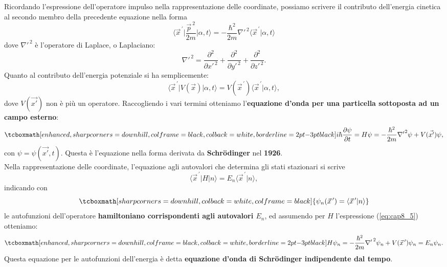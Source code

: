 \documentclass[a4paper,12pt,oneside]{book}
\begin{document}
Ricordando l'espressione dell'operatore impulso nella rappresentazione delle coordinate, possiamo scrivere il contributo dell'energia cinetica al secondo membro della precedente equazione nella forma
	\begin{equation}
		\langle {\vec{x}}^{\, \prime}\vert \frac{\vec{p}^{\ 2}}{2m} \vert \alpha , t \rangle = -\frac{\hbar^2}{2m}{{\nabla}'}^{\, 2}\langle {\vec{x}}^{\, \prime}\vert \alpha , t \rangle
\end{equation}
dove ${{\nabla}'}^{\, 2}$ è l'operatore di Laplace, o Laplaciano:
\begin{equation}
{{\nabla}'}^{\, 2}= \frac{\partial ^2}{\partial {x'} ^{\, 2}}+\frac{\partial ^2}{\partial {y'} ^{\, 2}}+\frac{\partial ^2}{\partial {z'} ^{\, 2}}.
\end{equation}
Quanto al contributo dell'energia potenziale si ha semplicemente:
	\begin{equation}
		\langle {\vec{x}}^{\, \prime}\vert V(\vec{x}) \vert \alpha , t \rangle = V({\vec{x}}^{\, \prime})\langle {\vec{x}}^{\, \prime}  \vert \alpha , t \rangle ,
	\end{equation}
dove $V(\vec{x'})$ non è più un operatore. Raccogliendo i vari termini otteniamo l'\textbf{equazione d'onda per una particella sottoposta ad un campo esterno}:
	\begin{equation}
		\tcboxmath[enhanced, sharp corners=downhill, colframe=black, colback=white, borderline={2pt}{-3pt}{black}]{
			i\hbar \frac{\partial \psi}{\partial t} = H\psi = -\frac{\hbar ^2}{2m}{\nabla '} ^2 \psi + V(\vec{x'}) \psi,
			}
\end{equation}
con $\psi =\psi(\vec{x'}, t)$. Questa è l'equazione nella forma derivata da \textbf{Schr\"{o}dinger} nel \textbf{1926}.\\

Nella rappresentazione delle coordinate, l'equazione agli autovalori che determina gli stati stazionari si scrive
	\begin{equation}
		\langle {\vec{x}}^{\, \prime} \vert H \vert n \rangle = E_n\langle {\vec{x}}^{\, \prime} \vert n \rangle,
	\end{equation}
indicando con
	\begin{equation}
		\tcboxmath[sharp corners=downhill, colback=white, colframe=black]{
			\psi _n ({\vec{x}}^{\, \prime}) = \langle {\vec{x}}^{\, \prime} \vert n \rangle
			}
	\end{equation}
le autofunzioni dell'operatore \textbf{hamiltoniano corrispondenti agli autovalori $E_n$}, ed assumendo per $H$ l'espressione (\ref{eq:cap8_5}) otteniamo:
	\begin{equation}
		\tcboxmath[enhanced, sharp corners=downhill, colframe=black, colback=white, borderline={2pt}{-3pt}{black}]{
			H\psi _n = -\frac{\hbar ^ 2}{2m}{{\nabla '}^{\, 2}} \psi _n + V({\vec{x}}^{\, \prime})\psi _n = E_n \psi _n.
			}
	\end{equation}
Questa equazione per le autofunzioni dell'energia è detta \textbf{equazione d'onda di Schr\"{o}dinger indipendente dal tempo}.\\
\end{document}
